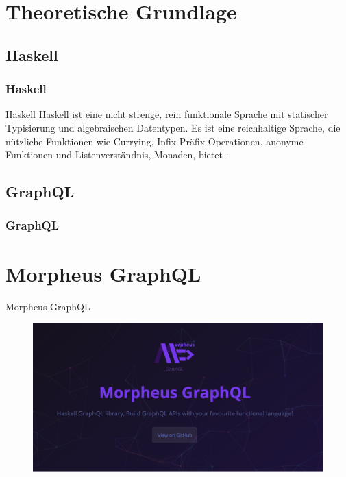 
\section{Theoretische Grundlage}

\subsection{Haskell}
\begin{frame}{}
    \frametitle{Haskell}
\end{frame}

\begin{frame}{}

    \begin{alertblock}{Haskell}
        Haskell ist eine nicht strenge, rein funktionale Sprache mit statischer Typisierung und algebraischen Datentypen. Es ist eine reichhaltige Sprache, die nützliche Funktionen wie Currying, Infix-Präfix-Operationen, anonyme Funktionen und Listenverständnis, Monaden, bietet \cite{history-of-haskell}.

    \end{alertblock}

\end{frame}


\subsection{GraphQL}
\begin{frame}{}
    \frametitle{GraphQL}
\end{frame}


\section{Morpheus GraphQL}
\begin{frame}{Morpheus GraphQL}
    \begin{figure}
        \centering
        \includegraphics[width=1.1\textwidth]{assets/img/morpheus-graphql-bg.png}
    \end{figure}
\end{frame}